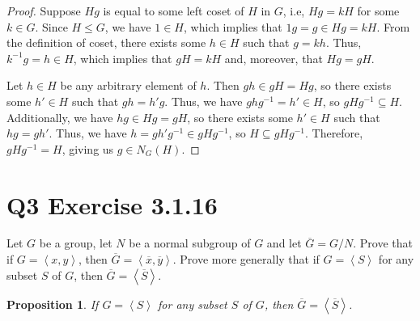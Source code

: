 \documentclass[12pt]{article}
\newtheorem{proposition}{Proposition}
\newenvironment{problem}
    {\begin{lrbox}{\mybox}\begin{minipage}{\textwidth-10pt}}
    {\end{minipage}\end{lrbox}\framebox[6.5in]{\usebox{\mybox}}}
\newcommand{\eqc}[1]{\overline{#1}}
\newcommand{\quo}[1]{\overline{#1}}
\newcommand{\<}{\left\langle}
\renewcommand{\>}{\right\rangle}
\begin{document}
\begin{proof}
    Suppose $Hg$ is equal to some left coset of $H$ in $G$, i.e, $Hg = kH$ for some $k\in G$. Since $H\leq G$, we have $1\in H$, which implies that $1g = g \in Hg = kH$. From the definition of coset, there exists some $h\in H$ such that $g = kh$. Thus, $k^{-1}g = h \in H$, which implies that $gH = kH$ and, moreover, that $Hg = gH$.
    
    Let $h\in H$ be any arbitrary element of $h$. Then $gh\in gH = Hg$, so there exists some $h'\in H$ such that $gh = h'g$. Thus, we have $ghg^{-1} = h' \in H$, so $gHg^{-1}\subseteq H$. Additionally, we have $hg\in Hg = gH$, so there exists some $h'\in H$ such that $hg = gh'$. Thus, we have $h = gh'g^{-1} \in gHg^{-1}$, so $H\subseteq gHg^{-1}$. Therefore, $gHg^{-1} = H$, giving us $g\in N_G(H)$.

\end{proof}

\section*{Q3 Exercise 3.1.16}
\begin{problem}
    Let $G$ be a group, let $N$ be a normal subgroup of $G$ and let $\quo{G} = G/N$. Prove that if $G=\<x,y\>$, then $\quo{G}=\<\eqc{x}, \eqc{y}\>$. Prove more generally that if $G=\<S\>$ for any subset $S$ of $G$, then $\quo{G} = \<\quo{S}\>$.
\end{problem}

\begin{proposition}
    If $G=\<S\>$ for any subset $S$ of $G$, then $\quo{G} = \<\quo{S}\>$.
\end{proposition}
\end{document}
